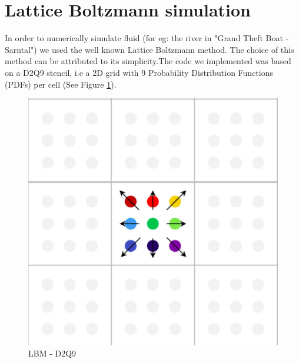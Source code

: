 \section{Lattice Boltzmann simulation}

In order to numerically simulate fluid (for eg: the river in "Grand Theft Boat - Sarntal") we used the well known Lattice Boltzmann method. The choice
of this method can be attributed to its simplicity.The code we implemented was based on a D2Q9 stencil, i.e a 2D grid with 9 Probability Distribution Functions (PDFs) per cell (See Figure \ref{fig: D2Q9 push scheme}). 

	
\begin{figure} [h]
\centering
\includegraphics[scale=0.4]{img/LBM/D2Q9_push}
\caption{LBM - D2Q9}
\label{fig: D2Q9 push scheme}
\end{figure}

